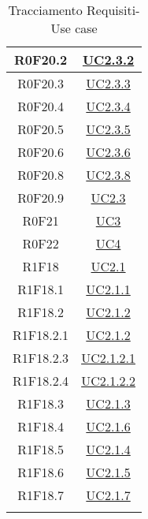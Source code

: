 \documentclass[../AnalisiDeiRequisiti.tex]{subfiles}
\begin{document}
\begin{longtable}{|c|c|}
	R0F20.2 & \hyperlink{UC2.3.2}{UC2.3.2}\\\hline
	R0F20.3 & \hyperlink{UC2.3.3}{UC2.3.3}\\\hline
	R0F20.4 & \hyperlink{UC2.3.4}{UC2.3.4}\\\hline
	R0F20.5 & \hyperlink{UC2.3.5}{UC2.3.5}\\\hline
	R0F20.6 & \hyperlink{UC2.3.6}{UC2.3.6}\\\hline
	R0F20.8 & \hyperlink{UC2.3.8}{UC2.3.8}\\\hline
	R0F20.9 & \hyperlink{UC2.3}{UC2.3}\\\hline
	R0F21 & \hyperlink{UC3}{UC3}\\\hline
	R0F22 & \hyperlink{UC4}{UC4}\\\hline
	R1F18 & \hyperlink{UC2.1}{UC2.1}\\\hline
	R1F18.1 & \hyperlink{UC2.1.1}{UC2.1.1}\\\hline
	R1F18.2 & \hyperlink{UC2.1.2}{UC2.1.2}\\\hline
	R1F18.2.1 & \hyperlink{UC2.1.2}{UC2.1.2}\\\hline
	R1F18.2.3 & \hyperlink{UC2.1.2.1}{UC2.1.2.1}\\\hline
	R1F18.2.4 & \hyperlink{UC2.1.2.2}{UC2.1.2.2}\\\hline
	R1F18.3 & \hyperlink{UC2.1.3}{UC2.1.3}\\\hline
	R1F18.4 & \hyperlink{UC2.1.6}{UC2.1.6}\\\hline
	R1F18.5 & \hyperlink{UC2.1.4}{UC2.1.4}\\\hline
	R1F18.6 & \hyperlink{UC2.1.5}{UC2.1.5}\\\hline
	R1F18.7 & \hyperlink{UC2.1.7}{UC2.1.7}\\\hline
	\caption[Tracciamento Requisiti-Use case]{Tracciamento Requisiti-Use case}
	\label{tabella:requi-usecase}
\end{longtable}
\clearpage
\end{document}
